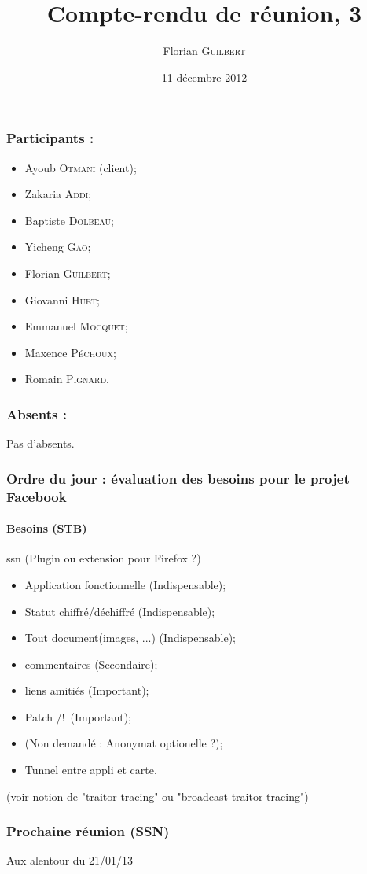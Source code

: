 \documentclass[a4paper,10pt]{article}
\author{Florian \textsc{Guilbert}}
\title{Compte-rendu de réunion, 3}
\date{11 décembre 2012}
\begin{document}
\maketitle

\subsubsection*{Participants : }
\begin{itemize}
    \item Ayoub \textsc{Otmani} (client);
    \item Zakaria \textsc{Addi};
    \item Baptiste \textsc{Dolbeau};
    \item Yicheng \textsc{Gao};
    \item Florian \textsc{Guilbert};
    \item Giovanni \textsc{Huet};
    \item Emmanuel \textsc{Mocquet};
    \item Maxence \textsc{Péchoux};
    \item Romain \textsc{Pignard}.
\end{itemize}

\subsubsection*{Absents : }
Pas d'absents.

\subsubsection*{Ordre du jour : évaluation des besoins pour le projet Facebook}

\paragraph{Besoins (STB)}
ssn (Plugin ou extension pour Firefox ?)
\begin{itemize}
        \item Application fonctionnelle (Indispensable);
        \item Statut chiffré/déchiffré (Indispensable);
        \item Tout document(images, ...) (Indispensable);
        \item commentaires (Secondaire);
        \item liens amitiés (Important);
        \item Patch /!\ (Important);
        \item (Non demandé : Anonymat optionelle ?);
        \item Tunnel entre appli et carte.
\end{itemize}
(voir notion de "traitor tracing" ou "broadcast traitor tracing")

\subsubsection*{Prochaine réunion (SSN)}
Aux alentour du 21/01/13
\end{document}
